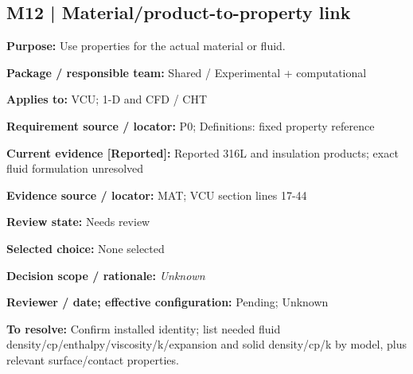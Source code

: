\documentclass[11pt]{article}
\begin{document}
\par\noindent\begin{minipage}{\textwidth}\small\setlength{\parskip}{2pt}
\subsection*{M12 | Material/product-to-property link}
\textbf{Purpose:} Use properties for the actual material or fluid.\par
\textbf{Package / responsible team:} Shared / Experimental + computational\par
\textbf{Applies to:} VCU; 1-D and CFD / CHT\par
\textbf{Requirement source / locator:} P0; Definitions: fixed property reference\par
\textbf{Current evidence [Reported]:} Reported 316L and insulation products; exact fluid formulation unresolved\par
\textbf{Evidence source / locator:} MAT; VCU section lines 17-44\par
\textbf{Review state:} Needs review\par
\textbf{Selected choice:} None selected\par
\textbf{Decision scope / rationale:} \textit{Unknown}\par
\textbf{Reviewer / date; effective configuration:} Pending; Unknown\par
\textbf{To resolve:} Confirm installed identity; list needed fluid density/cp/enthalpy/viscosity/k/expansion and solid density/cp/k by model, plus relevant surface/contact properties.\par
\end{minipage}\par\vspace{5pt}
\end{document}
